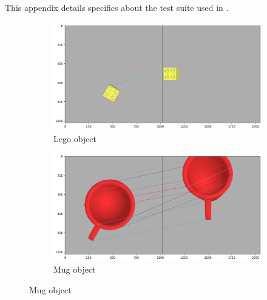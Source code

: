 This appendix details specifics about the test suite used in .\\

\begin{figure}[h]
    \centering
    \begin{subfigure}[b]{0.49\textwidth}
        \includegraphics[width=\textwidth]{figures/matchLego.png}
        \caption{Lego object}
    \end{subfigure}
    \hfill
    \begin{subfigure}[b]{0.49\textwidth}
        \includegraphics[width=\textwidth]{figures/matchMug.png}
        \caption{Mug object}
    \end{subfigure}


\end{figure}
